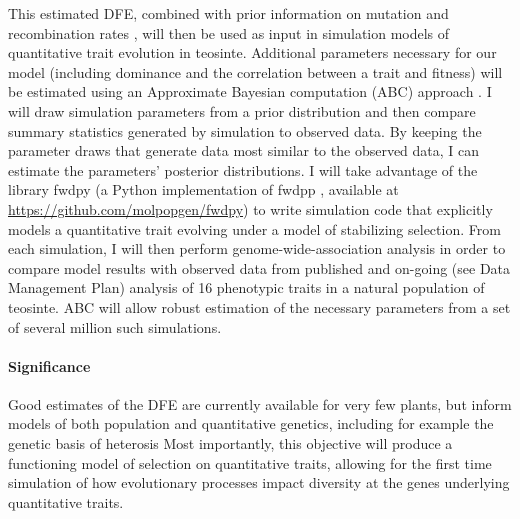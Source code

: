 This estimated DFE, combined with prior information on mutation \citep{Clark:2005} and recombination rates \citep{Rodgers-Melnick:2014}, will then be used as input in simulation models of quantitative trait evolution in teosinte. Additional parameters necessary for our model (including dominance and the correlation between a trait and fitness) will be estimated using an Approximate Bayesian computation (ABC) approach \citep{Beaumont:2002ue}. I will draw simulation parameters from a prior distribution and then compare summary statistics generated by simulation to observed data. By keeping the parameter draws that generate data most similar to the observed data, I can estimate the parameters' posterior distributions. I will take advantage of the library fwdpy (a Python implementation of fwdpp \citealt{Thornton:2014kn}, available at \url{https://github.com/molpopgen/fwdpy}) to write simulation code that explicitly models a quantitative trait evolving under a model of stabilizing selection. From each simulation, I will then perform genome-wide-association analysis in order to compare model results with observed data from published \citep{Weber:2009} and on-going (see Data Management Plan) analysis of 16 phenotypic traits in a natural population of teosinte. ABC will allow robust estimation of the necessary parameters from a set of several million such simulations. \vspace{-4ex}

\paragraph{Significance}
Good estimates of the DFE are currently available for very few plants, but inform models of both population and quantitative genetics, including for example the genetic basis of heterosis \citep{Mezmouk:2013wq}
Most importantly, this objective will produce a functioning model of selection on quantitative traits, allowing for the first time simulation of how evolutionary processes impact diversity at the genes underlying quantitative traits. \vspace{-1ex}

